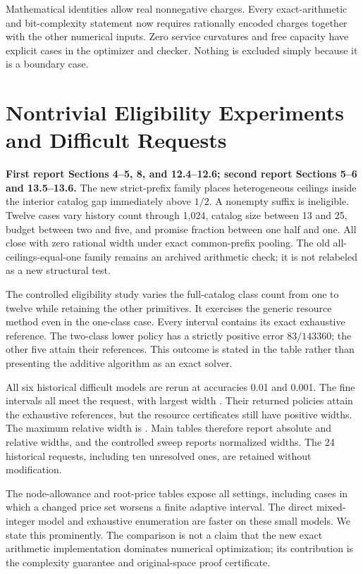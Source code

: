 Mathematical identities allow real nonnegative charges. Every exact-arithmetic and bit-complexity statement now requires rationally encoded charges together with the other numerical inputs. Zero service curvatures and free capacity have explicit cases in the optimizer and checker. Nothing is excluded simply because it is a boundary case.

\section{Nontrivial Eligibility Experiments and Difficult Requests}
\textbf{First report Sections 4--5, 8, and 12.4--12.6; second report Sections 5--6 and 13.5--13.6.}
The new strict-prefix family places heterogeneous ceilings inside the interior catalog gap immediately above $1/2$. A nonempty suffix is ineligible. Twelve cases vary history count through 1,024, catalog size between 13 and 25, budget between two and five, and promise fraction between one half and one. All close with zero rational width under exact common-prefix pooling. The old all-ceilings-equal-one family remains an archived arithmetic check; it is not relabeled as a new structural test.

The controlled eligibility study varies the full-catalog class count from one to twelve while retaining the other primitives. It exercises the generic resource method even in the one-class case. Every interval contains its exact exhaustive reference. The two-class lower policy has a strictly positive error $83/143360$; the other five attain their references. This outcome is stated in the table rather than presenting the additive algorithm as an exact solver.

All six historical difficult models are rerun at accuracies 0.01 and 0.001. The fine intervals all meet the request, with largest width \FineMaxGap. Their returned policies attain the exhaustive references, but the resource certificates still have positive widths. The maximum relative width is \FineMaxRelative. Main tables therefore report absolute and relative widths, and the controlled sweep reports normalized widths. The 24 historical requests, including ten unresolved ones, are retained without modification.

The node-allowance and root-price tables expose all settings, including cases in which a changed price set worsens a finite adaptive interval. The direct mixed-integer model and exhaustive enumeration are faster on these small models. We state this prominently. The comparison is not a claim that the new exact arithmetic implementation dominates numerical optimization; its contribution is the complexity guarantee and original-space proof certificate.

